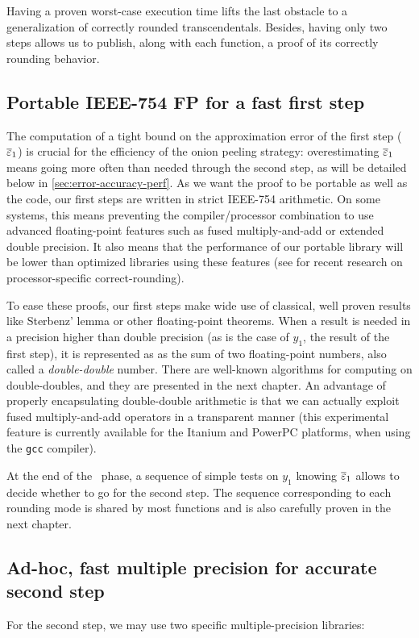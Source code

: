 Having a proven worst-case execution time lifts the last obstacle to a
generalization of correctly rounded transcendentals. Besides, having
only two steps allows us to publish, along with each function, a proof
of its correctly rounding behavior.


\subsection{Portable IEEE-754 FP for a fast first step}
The computation of a tight bound on the approximation error of the
first step (${\overline{\varepsilon}}_1$) is crucial for the efficiency of the onion
peeling strategy: overestimating ${\overline{\varepsilon}}_1$ means going more often
than needed through the second step, as will be detailed below in
\ref{sec:error-accuracy-perf}. As we want the proof to be portable as
well as the code, our first steps are written in strict IEEE-754
arithmetic. On some systems, this means preventing the
compiler/processor combination to use advanced floating-point features
such as fused multiply-and-add or extended double precision. It also
means that the performance of our portable library will be lower than
optimized libraries using these features (see \cite{DinErshGast2005} for
recent research on processor-specific correct-rounding).

To ease these proofs, our first steps make wide use of classical, well
proven results like Sterbenz' lemma or other floating-point theorems.
When a result is needed in a precision higher than double precision
(as is the case of $y_1$, the result of the first step), it is
represented as as the sum of two floating-point numbers, also called a
\emph{double-double} number.  There are well-known algorithms for
computing on double-doubles, and they are presented in the next
chapter. An advantage of properly encapsulating double-double
arithmetic is that we can actually exploit fused multiply-and-add
operators in a transparent manner (this experimental feature is
currently available for the Itanium and PowerPC platforms, when using
the \texttt{gcc} compiler).

At the end of the \quick\ phase, a sequence of simple tests on
$y_1$ knowing ${\overline{\varepsilon}}_1$ allows to decide whether to go for
the second step. The sequence corresponding to each rounding mode is
shared by most functions and is also carefully proven in the next
chapter.


\subsection{Ad-hoc, fast multiple precision for  accurate second step}
For the second step, we may use two specific multiple-precision libraries:

